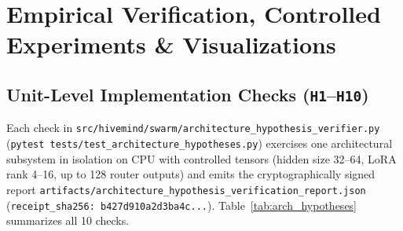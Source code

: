 \documentclass[11pt,a4paper]{article}
\begin{document}
\section{Empirical Verification, Controlled Experiments \& Visualizations}
\label{sec:exp_eval}

\subsection{Unit-Level Implementation Checks (\texttt{H1}--\texttt{H10})}

Each check in \texttt{src/hivemind/swarm/architecture\_hypothesis\_verifier.py} (\texttt{pytest tests/test\_architecture\_hypotheses.py}) exercises one architectural subsystem in isolation on CPU with controlled tensors (hidden size 32--64, LoRA rank 4--16, up to 128 router outputs) and emits the cryptographically signed report \texttt{artifacts/architecture\_hypothesis\_verification\_report.json} (\texttt{receipt\_sha256: b427d910a2d3ba4c...}). Table~\ref{tab:arch_hypotheses} summarizes all 10 checks.
\end{document}
